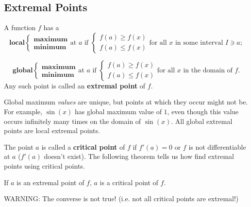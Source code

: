 



\subsection{Extremal Points}

\noindent A function $f$ has a
$$\textbf{local} \begin{cases}\textbf{maximum}\\\textbf{minimum}\end{cases}\text{at }a \text{ if }\begin{cases}f(a)\geq f(x)\\f(a)\leq f(x)\end{cases} \text{for all $x$ in some interval $I\ni a$};$$

$$\textbf{global} \begin{cases}\textbf{maximum}\\\textbf{minimum}\end{cases}\text{at }a \text{ if }\begin{cases}f(a)\geq f(x)\\f(a)\leq f(x)\end{cases} \text{for all $x$ in the domain of $f$}.$$
Any such point is called an \textbf{extremal point} of $f$.

Global maximum \textit{values} are unique, but points at which they occur might not be. For example, $\sin(x)$ has global maximum value of $1$, even though this value occurs infinitely many times on the domain of $\sin(x)$. All global extremal points are local extremal points.


The point $a$ is called a \textbf{critical point} of $f$ if $f'(a)=0$ or $f$ is not differentiable at $a$ ($f'(a)$ doesn't exist). The following theorem tells us how find extremal points using critical points.

\begin{thm}
If $a$ is an extremal point of $f$, $a$ is a critical point of $f$.
\end{thm}

\noindent WARNING: The converse is not true! (i.e. not all critical points are extremal!)

